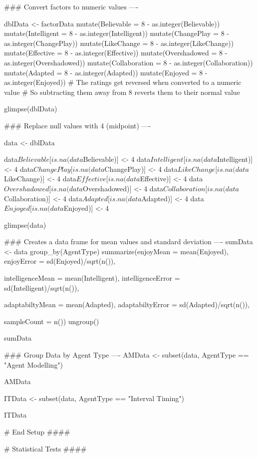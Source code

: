 \documentclass{IEEEtran}
\begin{document}
\begin{verbnobox}[\fontsize{10pt}{10pt}\selectfont]
### Convert factors to numeric values ----

dblData <- factorData %
  mutate(Believable = 8 - as.integer(Believable)) %
  mutate(Intelligent = 8 - as.integer(Intelligent)) %
  mutate(ChangePlay = 8 - as.integer(ChangePlay)) %
  mutate(LikeChange = 8 - as.integer(LikeChange)) %
  mutate(Effective = 8 - as.integer(Effective)) %
  mutate(Overshadowed = 8 - as.integer(Overshadowed)) %
  mutate(Collaboration = 8 - as.integer(Collaboration)) %
  mutate(Adapted = 8 - as.integer(Adapted)) %
  mutate(Enjoyed = 8 - as.integer(Enjoyed))
    # The ratings get reversed when converted to a numeric value
    # So subtracting them away from 8 reverts them to their normal value

glimpse(dblData)

### Replace null values with 4 (midpoint) ----

data <- dblData

  data$Believable[is.na(data$Believable)] <- 4
  data$Intelligent[is.na(data$Intelligent)] <- 4
  data$ChangePlay[is.na(data$ChangePlay)] <- 4
  data$LikeChange[is.na(data$LikeChange)] <- 4
  data$Effective[is.na(data$Effective)] <- 4
  data$Overshadowed[is.na(data$Overshadowed)] <- 4
  data$Collaboration[is.na(data$Collaboration)] <- 4
  data$Adapted[is.na(data$Adapted)] <- 4
  data$Enjoyed[is.na(data$Enjoyed)] <- 4

glimpse(data)

### Creates a data frame for mean values and standard deviation ----
sumData <- data %
  group_by(AgentType) %
  summarize(enjoyMean = mean(Enjoyed),
            enjoyError = sd(Enjoyed)/sqrt(n()),
            
            intelligenceMean = mean(Intelligent),
            intelligenceError = sd(Intelligent)/sqrt(n()),
            
            adaptabiltyMean = mean(Adapted),
            adaptabiltyError = sd(Adapted)/sqrt(n()),
            
            sampleCount = n())%
  ungroup()

sumData

### Group Data by Agent Type ----
AMData <- subset(data, AgentType == "Agent Modelling")

AMData

ITData <- subset(data, AgentType == "Interval Timing")

ITData

# End Setup ####


# Statistical Tests ####


\end{verbnobox}
\end{document}
